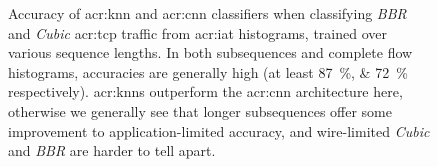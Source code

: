 \begin{figure}
    \centering
    \caption[Accuracy of $k$NN and CNN classifiers when classifying \emph{BBR} and \emph{Cubic} TCP traffic from IAT histograms, trained  over various sequence lengths.]{
    	Accuracy of \gls{acr:knn} and \gls{acr:cnn} classifiers when classifying \emph{BBR} and \emph{Cubic} \gls{acr:tcp} traffic from \gls{acr:iat} histograms, trained over various sequence lengths.
    	In both subsequences and complete flow histograms, accuracies are generally high (at least \qtylist{87; 72}{\percent} respectively).
    	\glspl{acr:knn} outperform the \gls{acr:cnn} architecture here, otherwise we generally see that longer subsequences offer some improvement to application-limited accuracy, and wire-limited \emph{Cubic} and \emph{BBR} are harder to tell apart.
 		\label{fig:2c-results}
    }
\end{figure}

